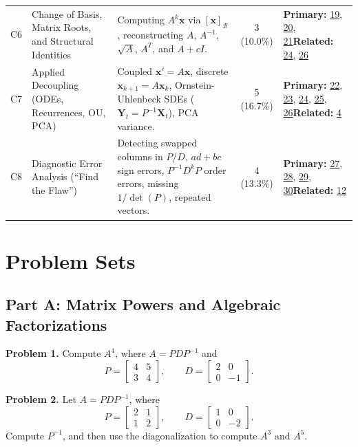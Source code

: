 \documentclass[11pt, letterpaper]{article}
\theoremstyle{definition}
\theoremstyle{remark}
\begin{document}
\begin{tabularx}{\textwidth}{l X X c p{3.1cm}}
\addlinespace[3pt]
C6 & Change of Basis, Matrix Roots, and Structural Identities & Computing $A^{k}\mathbf{x}$ via $[\mathbf{x}]_{\mathcal{B}}$, reconstructing $A$, $A^{-1}$, $\sqrt{A}$, $A^{T}$, and $A+cI$. & 3 (10.0\%) & \textbf{Primary:} \hyperref[prob:19]{19}, \hyperref[prob:20]{20}, \hyperref[prob:21]{21}\newline \textbf{Related:} \hyperref[prob:24]{24}, \hyperref[prob:26]{26} \\
\addlinespace[3pt]
C7 & Applied Decoupling (ODEs, Recurrences, OU, PCA) & Coupled $\mathbf{x}' = A\mathbf{x}$, discrete $\mathbf{x}_{k+1}=A\mathbf{x}_k$, Ornstein-Uhlenbeck SDEs ($\mathbf{Y}_t = P^{-1}\mathbf{X}_t$), PCA variance. & 5 (16.7\%) & \textbf{Primary:} \hyperref[prob:22]{22}, \hyperref[prob:23]{23}, \hyperref[prob:24]{24}, \hyperref[prob:25]{25}, \hyperref[prob:26]{26}\newline \textbf{Related:} \hyperref[prob:4]{4} \\
\addlinespace[3pt]
C8 & Diagnostic Error Analysis (``Find the Flaw'') & Detecting swapped columns in $P$/$D$, $ad+bc$ sign errors, $P^{-1}D^{k}P$ order errors, missing $1/\det(P)$, repeated vectors. & 4 (13.3\%) & \textbf{Primary:} \hyperref[prob:27]{27}, \hyperref[prob:28]{28}, \hyperref[prob:29]{29}, \hyperref[prob:30]{30}\newline \textbf{Related:} \hyperref[prob:12]{12} \\
\bottomrule
\end{tabularx}

\newpage
\section{Problem Sets}

\subsection{Part A: Matrix Powers and Algebraic Factorizations}

\textbf{Problem 1.}\label{prob:1}
Compute $A^{4}$, where $A = PDP^{-1}$ and
\[
P = \begin{bmatrix} 4 & 5 \\ 3 & 4 \end{bmatrix}, \qquad D = \begin{bmatrix} 2 & 0 \\ 0 & -1 \end{bmatrix}.
\]

\textbf{Problem 2.}\label{prob:2}
Let $A = PDP^{-1}$, where
\[
P = \begin{bmatrix} 2 & 1 \\ 1 & 2 \end{bmatrix}, \qquad D = \begin{bmatrix} 1 & 0 \\ 0 & -2 \end{bmatrix}.
\]
Compute $P^{-1}$, and then use the diagonalization to compute $A^{3}$ and $A^{5}$.
\end{document}
